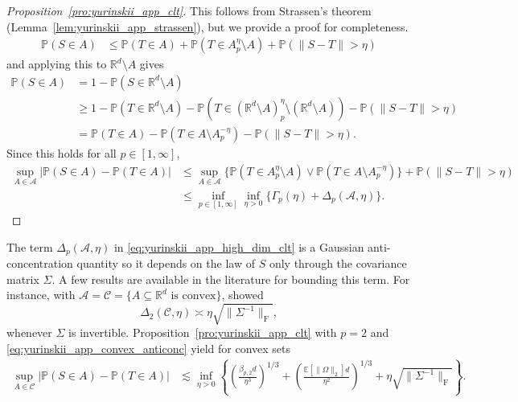 \documentclass[11pt,lof]{puthesis}
\renewcommand{\P}{\ensuremath{\mathbb{P}}}
\newcommand{\R}{\ensuremath{\mathbb{R}}}
\newcommand{\E}{\ensuremath{\mathbb{E}}}
\newcommand{\rF}{\ensuremath{\mathrm{F}}}
\newcommand{\cA}{\ensuremath{\mathcal{A}}}
\newcommand{\cC}{\ensuremath{\mathcal{C}}}
\theoremstyle{break}
\theoremstyle{proof}
\newtheorem{proof}{Proof}
\begin{document}
\begin{proof}[Proposition~\ref{pro:yurinskii_app_clt}]

This follows from Strassen's theorem
(Lemma~\ref{lem:yurinskii_app_strassen}), but we
provide a proof for completeness.
%
\begin{align*}
\P(S \in A)
&\leq
\P(T \in A)
+ \P(T \in A_p^\eta \setminus A)
+ \P(\|S - T\| > \eta)
\end{align*}
%
and applying this to $\R^d \setminus A$ gives
%
\begin{align*}
\P(S\in A)
&=
1 - \P(S\in \R^d \setminus A) \\
&\geq
1 - \P(T \in \R^d \setminus A)
- \P(T \in (\R^d \setminus A)_p^\eta \setminus (\R^d \setminus A))
- \P(\|S - T\| > \eta) \\
&=
\P(T \in A)
- \P(T \in A \setminus A_p^{-\eta})
- \P(\|S - T\| > \eta).
\end{align*}
%
Since this holds for all $p \in [1, \infty]$,
%
\begin{align*}
\sup_{A\in \cA}
\big|\P(S\in A) -\P(T\in A)\big|
&\leq
\sup_{A \in \cA}
\big\{\P(T \in A_p^\eta\setminus A)
\vee \P(T \in A \setminus A_p^{-\eta})\big\}
+ \P(\|S - T\| > \eta) \\
&\leq
\inf_{p \in [1, \infty]} \inf_{\eta>0}
\big\{\Gamma_p(\eta) + \Delta_p(\cA, \eta) \big\}.
\end{align*}
%
\end{proof}

The term $\Delta_p(\cA, \eta)$
in \eqref{eq:yurinskii_app_high_dim_clt} is a Gaussian anti-concentration
quantity
so it depends on the law of $S$ only through the covariance matrix $\Sigma$.
A few results are available in the literature
for bounding this term.
For instance, with
$\cA = \cC = \{A \subseteq \R^d \text{ is convex}\}$,
\citet{nazarov2003maximal} showed
%
\begin{equation}%
\label{eq:yurinskii_app_convex_anticonc}
\Delta_2(\cC, \eta)
\asymp
\eta\sqrt{\|\Sigma^{-1}\|_{\rF}},
\end{equation}
%
whenever $\Sigma$ is invertible.
Proposition~\ref{pro:yurinskii_app_clt} with $p=2$
and \eqref{eq:yurinskii_app_convex_anticonc} yield for convex sets
%
\begin{align*}
\sup_{A\in \cC}
\big|\P(S\in A) -\P(T\in A)\big|
&\lesssim
\inf_{\eta > 0}
\left\{
\left(\frac{\beta_{p,2} d}{\eta^3}\right)^{1/3}
+ \left(\frac{\E[\|\Omega \|_2] d}{\eta^2}\right)^{1/3}
+ \eta \sqrt{\|\Sigma^{-1}\|_\rF}
\right\}.
\end{align*}
\end{document}
